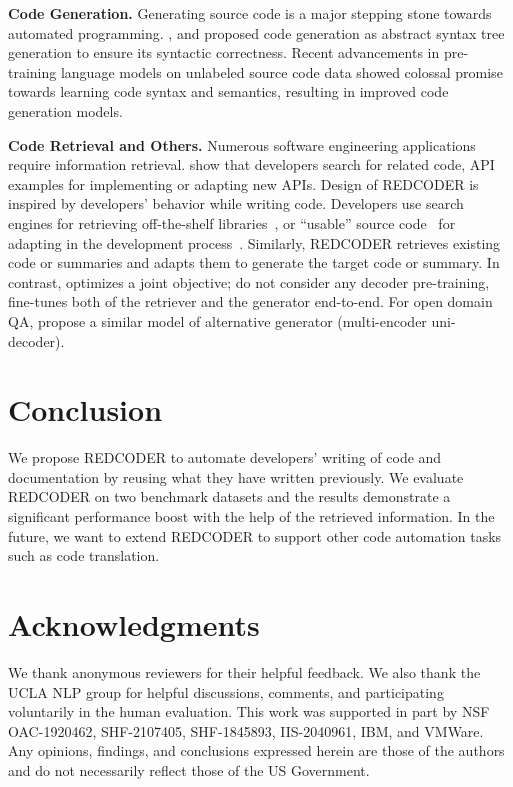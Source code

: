 \documentclass[11pt]{article}
\newcommand{\tool}{{REDCODER}\xspace}
\begin{document}
\smallskip
\noindent\textbf{Code Generation.} Generating source code is a major stepping stone towards automated programming.
\citet{yin-neubig-2017-syntactic}, and \citet{rabinovich-etal-2017-abstract} proposed code generation as abstract syntax tree generation to ensure its syntactic correctness.
Recent advancements in pre-training language models on unlabeled source code data \cite{CodeXGLUE, ahmad2021unified} showed colossal promise towards learning code syntax and semantics, resulting in improved code generation models.


\smallskip
\noindent\textbf{Code Retrieval and Others.} 
Numerous software engineering applications require information retrieval. \citet{sadowski2015developers, xia2017developers, stolee2014solving, sim2011well} show that developers search for related code, API examples for implementing or adapting new APIs.  Design of \tool is inspired by developers' behavior while writing code. Developers use search engines for retrieving off-the-shelf libraries~\cite{hucka2018software}, or ``usable'' source code~\cite{rahman2018evaluating} for adapting in the development process~\cite{nasehi2012makes, arwan2015source, ponzanelli2014mining}. Similarly, \tool retrieves existing code or summaries and adapts them to generate the target code or summary. In contrast, \citet{NEURIPS2018_cd17d3ce} optimizes a joint objective; \citet{zhang2020retrieval,liu2021retrievalaugmented} do not consider  any decoder pre-training, \citet{RAG_NEURIPS2020_6b493230} fine-tunes both of the retriever and the generator end-to-end. For open domain QA, \citet{izacard-grave-2021-leveraging} propose a similar model of alternative generator (multi-encoder uni-decoder). 

 \section{Conclusion}





We propose \tool to automate developers' writing of code and documentation by reusing what they have written  previously. 
We evaluate \tool on two benchmark datasets and the results demonstrate a significant performance boost with the help of the retrieved information. In the future, we want to extend \tool to support other code automation tasks such as code translation.
 

\section*{Acknowledgments}
We thank anonymous reviewers for their helpful feedback.
We also thank the UCLA NLP group for helpful discussions, comments, and participating voluntarily in the human evaluation.
This work was supported in part by NSF 
OAC-1920462, SHF-2107405, SHF-1845893, IIS-2040961, IBM, and VMWare.
Any opinions, findings, and conclusions expressed herein are those of the authors and do not necessarily reflect those of the US Government.
\end{document}
